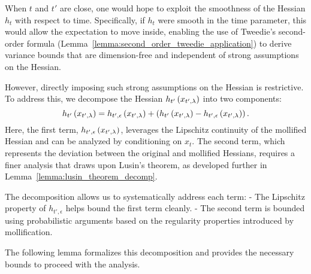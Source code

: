 When \(t\) and \(t'\) are close, one would hope to exploit the smoothness of the Hessian \(h_t\) with respect to time. Specifically, if \(h_t\) were smooth in the time parameter, this would allow the expectation to move inside, enabling the use of Tweedie’s second-order formula (Lemma~\ref{lemma:second_order_tweedie_application}) to derive variance bounds that are dimension-free and independent of strong assumptions on the Hessian.

However, directly imposing such strong assumptions on the Hessian is restrictive. To address this, we decompose the Hessian \(h_{t'}\left(x_{t',\lambda}\right)\) into two components:
\[
h_{t'}\left(x_{t',\lambda}\right) = h_{t', \epsilon}\left(x_{t',\lambda}\right) + \left(h_{t'}\left(x_{t',\lambda}\right) - h_{t', \epsilon}\left(x_{t',\lambda}\right)\right).
\]
Here, the first term, \(h_{t', \epsilon}\left(x_{t',\lambda}\right)\), leverages the Lipschitz continuity of the mollified Hessian and can be analyzed by conditioning on \(x_t\). The second term, which represents the deviation between the original and mollified Hessians, requires a finer analysis that draws upon Lusin's theorem, as developed further in Lemma~\ref{lemma:lusin_theorem_decomp}.

The decomposition allows us to systematically address each term: 
- The Lipschitz property of \(h_{t',\epsilon}\) helps bound the first term cleanly.
- The second term is bounded using probabilistic arguments based on the regularity properties introduced by mollification.

The following lemma formalizes this decomposition and provides the necessary bounds to proceed with the analysis.


